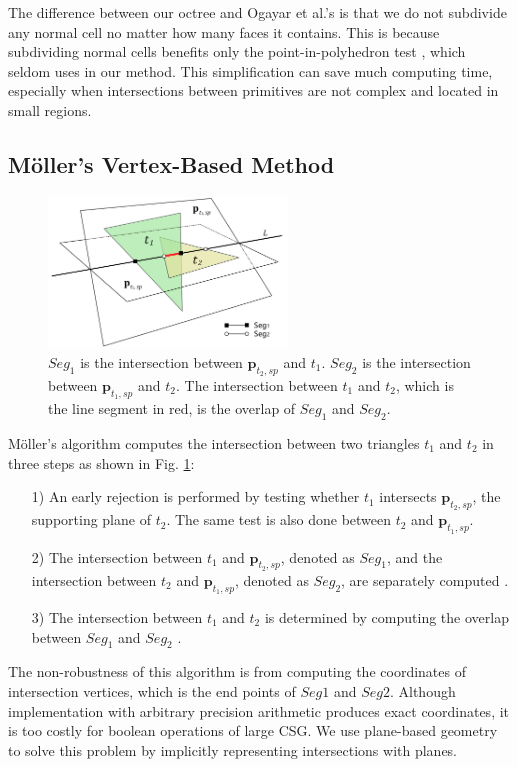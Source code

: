 \documentclass[10pt,journal,compsoc]{IEEEtran}
\begin{document}
The difference between our octree and Ogayar et al.'s is that we do not subdivide any normal cell no matter how many faces it contains. This is because subdividing normal cells benefits only the point-in-polyhedron test  \cite{frisken2002simple}, which seldom uses in our method. This simplification can save much computing time, especially when intersections between primitives are not complex and located in small regions.




\subsection{M\"{o}ller's Vertex-Based Method}

\begin{figure}[t]
\centering
\includegraphics[width=2.5in]{projection}
\caption{$Seg_1$ is the intersection between $\bm{p}_{t_2, sp}$ and $t_1$. $Seg_2$ is the intersection between $\bm{p}_{t_1, sp}$ and $t_2$. The intersection between $t_1$ and $t_2$, which is the line segment in red, is the overlap of $Seg_1$ and $Seg_2$.}
\label{fig_projection}
\end{figure}


M\"{o}ller's algorithm computes the intersection between two triangles $t_1$ and $t_2$ in three steps as shown in Fig. \ref{fig_projection}:
\begin{itemize}[leftmargin=0.45cm]
\item[1)] An early rejection is performed by testing whether $t_1$ intersects $\bm{p}_{t_2, sp}$, the supporting plane of $t_2$. The same test is also done between $t_2$ and $\bm{p}_{t_1, sp}$.
\item[2)]The intersection between $t_1$ and $\bm{p}_{t_2, sp}$, denoted as $Seg_1$, and the intersection between $t_2$ and $\bm{p}_{t_1, sp}$, denoted as $Seg_2$, are separately computed .
 \item[3)]The intersection between $t_1$ and $t_2$ is determined by computing the overlap between $Seg_1$ and $Seg_2$ .
\end{itemize}

The non-robustness of this algorithm is from computing the coordinates of intersection vertices, which is the end points of $Seg1$ and $Seg2$. Although implementation with arbitrary precision arithmetic produces exact coordinates, it is too costly for boolean operations of large CSG. We use plane-based geometry to solve this problem by implicitly representing intersections with planes.
\end{document}
